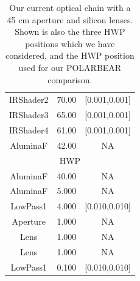 \documentclass{article}
\theoremstyle{remark}
\begin{document}
\begin{table}
\begin{tabular}{|c|c|c|}
IRShader2	& 70.00  & [0.001,0.001]	\\
IRShader3	& 65.00  & [0.001,0.001]	\\
IRShader4	& 61.00  & [0.001,0.001]	\\
AluminaF	& 42.00  &  NA			  	\\
\hline
\multicolumn{3}{|c|}{HWP} \\
\hline
AluminaF	& 40.00  &  NA			  	\\
AluminaF	& 5.000  &  NA			  	\\
LowPass1	& 4.000  & [0.010,0.010]	\\
Aperture	& 1.000  & NA	       	\\
Lens		& 1.000  &  NA			  	\\
Lens		& 1.000  &  NA			  	\\
LowPass1	& 0.100  & [0.010,0.010]	\\

\hline
\end{tabular}

\caption{Our current optical chain with a 45 cm aperture and silicon lenses.
Shown is also the three HWP positions which we have considered, and the HWP position used for our POLARBEAR comparison.
}

\label{table:SO_OpticalChain}
\end{table}
\end{document}
